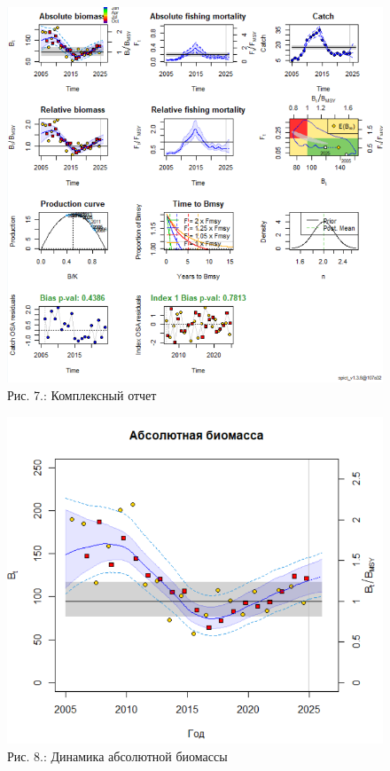 \documentclass[
  letterpaper,
  DIV=11,
  numbers=noendperiod]{scrreprt}
\begin{document}
\begin{figure}[H]

{\centering \includegraphics[width=0.8\linewidth,height=\textheight,keepaspectratio]{images/SPICT7.PNG}

}

\caption{Рис. 7.: Комплексный отчет}

\end{figure}%

\begin{figure}[H]

{\centering \includegraphics[width=0.6\linewidth,height=\textheight,keepaspectratio]{images/SPICT8.PNG}

}

\caption{Рис. 8.: Динамика абсолютной биомассы}

\end{figure}%
\end{document}
